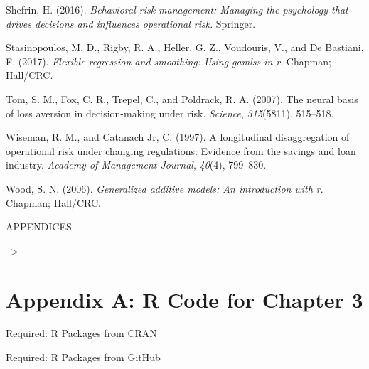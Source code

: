\documentclass[]{DissertateUSU}
\begin{document}
\hypertarget{ref-shefrin2016behavioral}{}
Shefrin, H. (2016). \emph{Behavioral risk management: Managing the
psychology that drives decisions and influences operational risk}.
Springer.

\hypertarget{ref-stasinopoulos2017flexible}{}
Stasinopoulos, M. D., Rigby, R. A., Heller, G. Z., Voudouris, V., and De
Bastiani, F. (2017). \emph{Flexible regression and smoothing: Using
gamlss in r}. Chapman; Hall/CRC.

\hypertarget{ref-tom2007neural}{}
Tom, S. M., Fox, C. R., Trepel, C., and Poldrack, R. A. (2007). The
neural basis of loss aversion in decision-making under risk.
\emph{Science}, \emph{315}(5811), 515--518.

\hypertarget{ref-wiseman1997longitudinal}{}
Wiseman, R. M., and Catanach Jr, C. (1997). A longitudinal
disaggregation of operational risk under changing regulations: Evidence
from the savings and loan industry. \emph{Academy of Management
Journal}, \emph{40}(4), 799--830.

\hypertarget{ref-wood2006generalized}{}
Wood, S. N. (2006). \emph{Generalized additive models: An introduction
with r}. Chapman; Hall/CRC.

\clearpage
{} 
\fancyhead[R]{\thepage} \fancyfoot[C]{}

\vspace*{\fill}

\begin{center}
    APPENDICES 
  \end{center}

\vspace*{\fill}

\clearpage

--\textgreater{}

\doublespacing

\section*{Appendix A: R Code for Chapter
3}\label{appendix-a-r-code-for-chapter-3}

\singlespace

Required: R Packages from CRAN

\small

\normalsize

Required: R Packages from GitHub

\small
\end{document}
